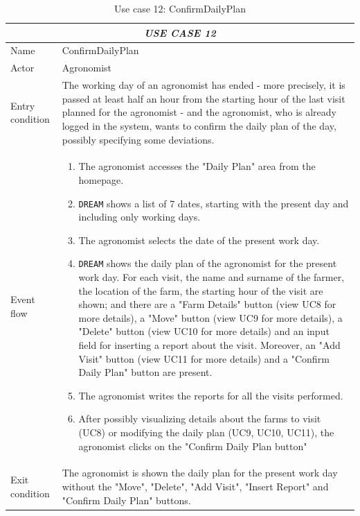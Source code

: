 \documentclass{article}
\begin{document}
\centering
\begin{longtable}{|p{3.5cm}|m{8cm}|}
\caption{Use case 12: ConfirmDailyPlan}
 \label{uc12}
 \hline
 \multicolumn{2}{|c|}{\cellcolor{white}\emph{USE CASE 12}} \\
 \endfirsthead
 \endhead
 \endfoot
 \endlastfoot
 \hline
 Name & ConfirmDailyPlan\\
 \hline
 Actor & Agronomist\\
 \hline
 Entry condition & The working day of an agronomist has ended - more precisely, it is passed at least half an hour from the starting hour of the last visit planned for the agronomist  - and the agronomist, who is already logged in the system, wants to confirm the daily plan of the day, possibly specifying some deviations.\\
 \hline
 Event flow & \begin{enumerate}
    \item The agronomist accesses the "Daily Plan" area from the homepage.
    \item \verb|DREAM| shows a list of 7 dates, starting with the present day and including only working days.
    \item The agronomist selects the date of the present work day.
    \item \verb|DREAM| shows the daily plan of the agronomist for the present work day. For each visit, the name and surname of the farmer, the location of the farm, the starting hour of the visit are shown; and there are a "Farm Details" button (view UC8 for more details), a "Move" button (view UC9 for more details), a "Delete" button (view UC10 for more details) and an input field for inserting a report about the visit. Moreover, an "Add Visit" button (view UC11 for more details) and a "Confirm Daily Plan" button are present.
    \item The agronomist writes the reports for all the visits performed.
    \item After possibly visualizing details about the farms to visit (UC8) or modifying the daily plan (UC9, UC10, UC11), the agronomist clicks on the "Confirm Daily Plan button"
 \end{enumerate}\\
 \hline
 Exit condition & The agronomist is shown the daily plan for the present work day without the "Move", "Delete", "Add Visit", "Insert Report" and "Confirm Daily Plan" buttons. \\

\end{longtable}
\end{document}
